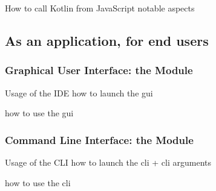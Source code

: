 \documentclass[handout]{beamer}
\begin{document}
\begin{frame}[allowframebreaks]{How to call Kotlin from JavaScript}
    notable aspects
\end{frame}

\subsection{As an application, for end users}

\subsubsection{Graphical User Interface: the  Module}

\begin{frame}[allowframebreaks]{Usage of the IDE}
    how to launch the gui

    how to use the gui
\end{frame}

\subsubsection{Command Line Interface: the  Module}

\begin{frame}[allowframebreaks]{Usage of the CLI}
    how to launch the cli
        + cli arguments

    how to use the cli
\end{frame}

\section*{}
\frame{\titlepage}

\section*{\bibname}


\begin{frame}\frametitle{\refname}
    \footnotesize
    
    
\end{frame}

\end{document}
